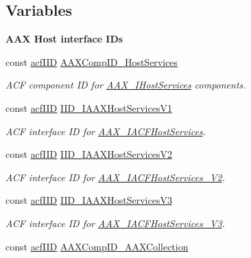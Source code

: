 \subsection*{Variables}
\begin{Indent}\textbf{ A\+AX Host interface I\+Ds}\par
\begin{DoxyCompactItemize}
\item 
const \mbox{\hyperlink{a00269_a59df0b41744eee7a066787aaedf97f67}{acf\+I\+ID}} \mbox{\hyperlink{a00683_a0790e4ae407d6560ce1f605f29df324f}{A\+A\+X\+Comp\+I\+D\+\_\+\+Host\+Services}}
\begin{DoxyCompactList}\small\item\em A\+CF component ID for \mbox{\hyperlink{a01841}{A\+A\+X\+\_\+\+I\+Host\+Services}} components. \end{DoxyCompactList}\item 
const \mbox{\hyperlink{a00269_a59df0b41744eee7a066787aaedf97f67}{acf\+I\+ID}} \mbox{\hyperlink{a00683_aa2268f8c1f129f4f75a27ea3f4a4183b}{I\+I\+D\+\_\+\+I\+A\+A\+X\+Host\+Services\+V1}}
\begin{DoxyCompactList}\small\item\em A\+CF interface ID for \mbox{\hyperlink{a01713}{A\+A\+X\+\_\+\+I\+A\+C\+F\+Host\+Services}}. \end{DoxyCompactList}\item 
const \mbox{\hyperlink{a00269_a59df0b41744eee7a066787aaedf97f67}{acf\+I\+ID}} \mbox{\hyperlink{a00683_a19fae45f6510abfe803b5513bf3f2b85}{I\+I\+D\+\_\+\+I\+A\+A\+X\+Host\+Services\+V2}}
\begin{DoxyCompactList}\small\item\em A\+CF interface ID for \mbox{\hyperlink{a01717}{A\+A\+X\+\_\+\+I\+A\+C\+F\+Host\+Services\+\_\+\+V2}}. \end{DoxyCompactList}\item 
const \mbox{\hyperlink{a00269_a59df0b41744eee7a066787aaedf97f67}{acf\+I\+ID}} \mbox{\hyperlink{a00683_ac6e4f090679f63cbed6538c9b08dc119}{I\+I\+D\+\_\+\+I\+A\+A\+X\+Host\+Services\+V3}}
\begin{DoxyCompactList}\small\item\em A\+CF interface ID for \mbox{\hyperlink{a01721}{A\+A\+X\+\_\+\+I\+A\+C\+F\+Host\+Services\+\_\+\+V3}}. \end{DoxyCompactList}\item 
const \mbox{\hyperlink{a00269_a59df0b41744eee7a066787aaedf97f67}{acf\+I\+ID}} \mbox{\hyperlink{a00683_adce9a55e7654b4bb7e41cdc8d91d119d}{A\+A\+X\+Comp\+I\+D\+\_\+\+A\+A\+X\+Collection}}

\end{DoxyCompactItemize}
\end{Indent}
